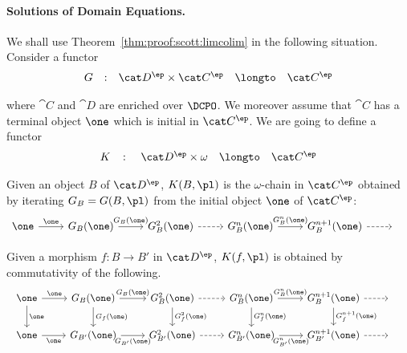 \paragraph{Solutions of Domain Equations.}
We shall use Theorem~\ref{thm:proof:scott:limcolim}
in the following situation.
Consider a functor
\[
\begin{array}{*{5}{l}}
  G
& :
& \cat D^\ep \times \cat C^\ep
& \longto
& \cat C^\ep
\end{array}
\]

\noindent
where $\cat C$ and $\cat D$ are enriched over $\DCPO$.
We moreover assume that $\cat C$ has a terminal object $\one$
which is initial in $\cat C^\ep$.
We are going to define a functor
\[
\begin{array}{*{5}{l}}
  K
& \colon
& \cat D^\ep \times \omega
& \longto
& \cat C^\ep
\end{array}
\]

\noindent
Given an object $B$ of $\cat D^\ep$,
$K(B,\pl)$ is the $\omega$-chain in $\cat C^\ep$
obtained by iterating $G_B = G(B,\pl)$ from the initial object $\one$ of $\cat C^\ep$:
\begin{equation}
\label{diag:proof:scott:chain}
\begin{tikzcd} %
  \one
  \arrow{r}[above]{\one}
& G_B(\one)
   \arrow{r}[above]{G_B(\one)}
 & G^2_B(\one)
  \arrow[dashed]{r}
& G^n_B(\one)
  \arrow{r}[above]{G_B^n(\one)}
& G^{n+1}_B(\one)
  \arrow[dashed]{r}
& \phantom{F}
\end{tikzcd}
\end{equation}


Given a morphism $f \colon B \to B'$ in $\cat D^\ep$,
$K(f,\pl)$ is obtained by commutativity of the following.
\begin{equation}
\label{diag:proof:scott:natdiag}
\begin{array}{c}
\begin{tikzcd} %

  \one
  \arrow{r}[above]{\one}
  \arrow{d}{\one}
& G_B(\one)
   \arrow{r}[above]{G_B(\one)}
   \arrow{d}{G_f(\one)}
 & G^2_B(\one)
   \arrow{d}{G_f^2(\one)}
  \arrow[dashed]{r}
& G^n_B(\one)
  \arrow{r}[above]{G_B^n(\one)}
  \arrow{d}{G_f^n(\one)}
& G^{n+1}_B(\one)
  \arrow{d}{G_f^{n+1}(\one)}
  \arrow[dashed]{r}
& \phantom{F}

\\

  \one
  \arrow{r}[below]{\one}
& G_{B'}(\one)
   \arrow{r}[below]{G_{B'}(\one)}
 & G^2_{B'}(\one)
  \arrow[dashed]{r}
& G^n_{B'}(\one)
  \arrow{r}[below]{G_{B'}^n(\one)}
& G^{n+1}_{B'}(\one)
  \arrow[dashed]{r}
& \phantom{F}
\end{tikzcd}
\end{array}
\end{equation}



